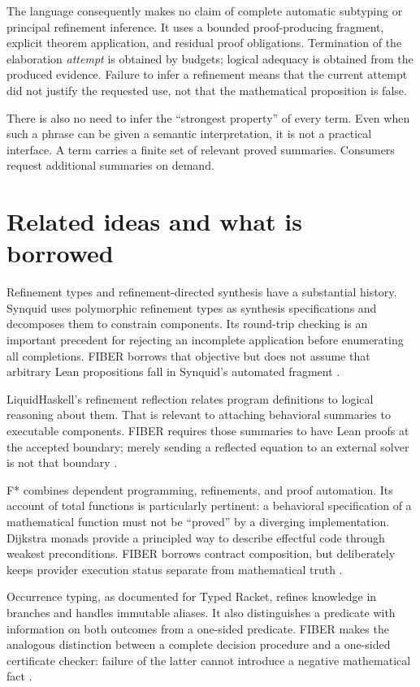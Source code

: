 \documentclass[11pt,letterpaper]{article}
\theoremstyle{definition}\newtheorem{definition}[theorem]{Definition}
\begin{document}
The language consequently makes no claim of complete automatic subtyping or principal refinement inference. It uses a bounded proof-producing fragment, explicit theorem application, and residual proof obligations. Termination of the elaboration \emph{attempt} is obtained by budgets; logical adequacy is obtained from the produced evidence. Failure to infer a refinement means that the current attempt did not justify the requested use, not that the mathematical proposition is false.

There is also no need to infer the ``strongest property'' of every term. Even when such a phrase can be given a semantic interpretation, it is not a practical interface. A term carries a finite set of relevant proved summaries. Consumers request additional summaries on demand.

\section{Related ideas and what is borrowed}\label{sec:related}
Refinement types and refinement-directed synthesis have a substantial history. Synquid uses polymorphic refinement types as synthesis specifications and decomposes them to constrain components. Its round-trip checking is an important precedent for rejecting an incomplete application before enumerating all completions. FIBER borrows that objective but does not assume that arbitrary Lean propositions fall in Synquid's automated fragment \cite{synquid,synthesisLecture}.

LiquidHaskell's refinement reflection relates program definitions to logical reasoning about them. That is relevant to attaching behavioral summaries to executable components. FIBER requires those summaries to have Lean proofs at the accepted boundary; merely sending a reflected equation to an external solver is not that boundary \cite{liquid}.

F* combines dependent programming, refinements, and proof automation. Its account of total functions is particularly pertinent: a behavioral specification of a mathematical function must not be ``proved'' by a diverging implementation. Dijkstra monads provide a principled way to describe effectful code through weakest preconditions. FIBER borrows contract composition, but deliberately keeps provider execution status separate from mathematical truth \cite{fstar,dm4free}.

Occurrence typing, as documented for Typed Racket, refines knowledge in branches and handles immutable aliases. It also distinguishes a predicate with information on both outcomes from a one-sided predicate. FIBER makes the analogous distinction between a complete decision procedure and a one-sided certificate checker: failure of the latter cannot introduce a negative mathematical fact \cite{occurrence}.
\end{document}

